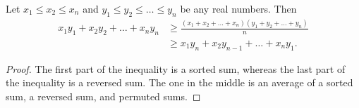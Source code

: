 \documentclass[../main.tex]{subfiles}
\begin{document}
\begin{thm} \label{thm:chebyshev}
    Let $x_1 \leq x_2 \leq x_n$ and $y_1 \leq y_2 \leq \dots \leq y_n$ be any real numbers.
    Then
    \begin{align*}
        x_1 y_1 + x_2 y_2 + \dots + x_n y_n &\geq \frac{(x_1 + x_2 + \dots + x_n)(y_1 + y_2 + \dots + y_n)}{n}\\
                                            &\geq x_1 y_n + x_2 y_{n-1} + \dots + x_n y_1.
    \end{align*}
\end{thm}
\begin{proof}
    The first part of the inequality is a sorted sum, whereas the last part of the inequality is a reversed sum.
    The one in the middle is an average of a sorted sum, a reversed sum, and permuted sums.
\end{proof}
\end{document}
